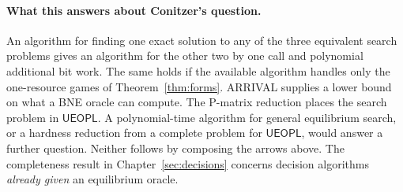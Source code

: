 \documentclass[11pt,oneside,openany,notitlepage]{report}
\begin{document}
\paragraph{What this answers about Conitzer's question.}
An algorithm for finding one exact solution to any of the three equivalent
search problems gives an algorithm for the other two by one call and
polynomial additional bit work. The same holds if the available algorithm
handles only the one-resource games of Theorem~\ref{thm:forms}.
ARRIVAL supplies a lower bound on what a BNE oracle can compute. The
P-matrix reduction places the search problem in \(\mathsf{UEOPL}\).
A polynomial-time algorithm for general equilibrium search, or a hardness
reduction from a complete problem for \(\mathsf{UEOPL}\), would answer a
further question. Neither follows by composing the arrows above.
The completeness result in Chapter~\ref{sec:decisions} concerns decision
algorithms \emph{already given} an equilibrium oracle.
\end{document}
